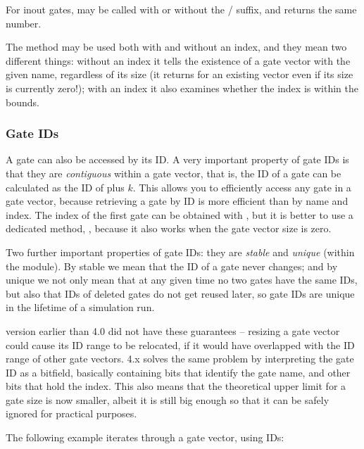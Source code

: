 For inout gates,  may be called with or without
the / suffix, and returns the same number.

The  method may be used both with and without an
index, and they mean two different things: without an index it tells
the existence of a gate vector with the given name, regardless of its
size (it returns  for an existing vector even if its size
is currently zero!); with an index it also examines whether the index
is within the bounds.


\subsubsection{Gate IDs}

A gate can also be accessed by its ID. A very important property of gate IDs
is that they are \textit{contiguous} within a gate vector, that is,
the ID of a gate  can be calculated as the ID of  plus $k$.
This allows you to efficiently access any gate in a gate vector, because
retrieving a gate by ID is more efficient than by name and index.
The index of the first gate can be obtained with ,
but it is better to use a dedicated method, ,
because it also works when the gate vector size is zero.

Two further important properties of gate IDs: they are \textit{stable}
and \textit{unique} (within the module). By stable we mean that the ID
of a gate never changes; and by unique we not only mean that at any
given time no two gates have the same IDs, but also that IDs of deleted
gates do not get reused later, so gate IDs are unique in the lifetime
of a simulation run.

\begin{note}
    {\opp} version earlier than 4.0 did not have these guarantees -- resizing
    a gate vector could cause its ID range to be relocated, if it
    would have overlapped with the ID range of other gate vectors.
    {\opp} 4.x solves the same problem by interpreting the gate ID
    as a bitfield, basically containing bits that identify the gate name,
    and other bits that hold the index. This also means that the theoretical
    upper limit for a gate size is now smaller, albeit it is still
    big enough so that it can be safely ignored for practical purposes.
\end{note}

The following example iterates through a gate vector, using IDs:


